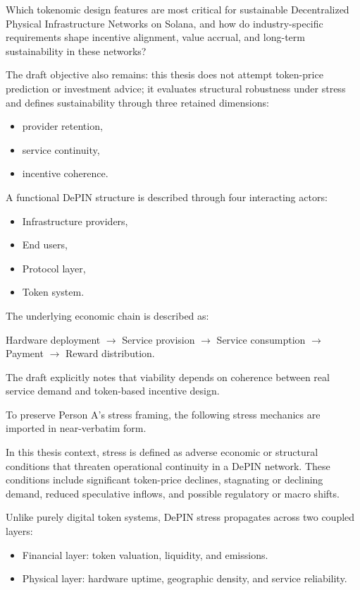 Which tokenomic design features are most critical for sustainable Decentralized Physical Infrastructure Networks on Solana, and how do industry-specific requirements shape incentive alignment, value accrual, and long-term sustainability in these networks?

The draft objective also remains: this thesis does not attempt token-price prediction or investment advice; it evaluates structural robustness under stress and defines sustainability through three retained dimensions:
\begin{itemize}
    \item provider retention,
    \item service continuity,
    \item incentive coherence.
\end{itemize}

A functional DePIN structure is described through four interacting actors:
\begin{itemize}
    \item Infrastructure providers,
    \item End users,
    \item Protocol layer,
    \item Token system.
\end{itemize}

The underlying economic chain is described as:

Hardware deployment $\rightarrow$ Service provision $\rightarrow$ Service consumption $\rightarrow$ Payment $\rightarrow$ Reward distribution.

The draft explicitly notes that viability depends on coherence between real service demand and token-based incentive design.

To preserve Person A's stress framing, the following stress mechanics are imported in near-verbatim form.

In this thesis context, stress is defined as adverse economic or structural conditions that threaten operational continuity in a DePIN network. These conditions include significant token-price declines, stagnating or declining demand, reduced speculative inflows, and possible regulatory or macro shifts.

Unlike purely digital token systems, DePIN stress propagates across two coupled layers:
\begin{itemize}
    \item Financial layer: token valuation, liquidity, and emissions.
    \item Physical layer: hardware uptime, geographic density, and service reliability.
\end{itemize}

